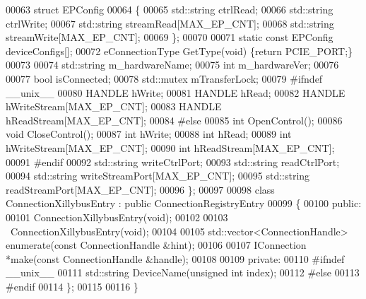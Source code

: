 \begin{DoxyCode}
00063     \textcolor{keyword}{struct }EPConfig
00064     \{
00065         std::string ctrlRead;
00066         std::string ctrlWrite;
00067         std::string streamRead[MAX_EP_CNT];
00068         std::string streamWrite[MAX_EP_CNT];
00069     \};
00070 
00071     \textcolor{keyword}{static} \textcolor{keyword}{const} EPConfig deviceConfigs[];
00072     eConnectionType GetType(\textcolor{keywordtype}{void}) \{\textcolor{keywordflow}{return} PCIE_PORT;\}
00073 
00074     std::string m_hardwareName;
00075     \textcolor{keywordtype}{int} m_hardwareVer;
00076 
00077     \textcolor{keywordtype}{bool} isConnected;
00078     std::mutex mTransferLock;
00079 \textcolor{preprocessor}{#ifndef \_\_unix\_\_}
00080     HANDLE hWrite;
00081     HANDLE hRead;
00082     HANDLE hWriteStream[MAX_EP_CNT];
00083     HANDLE hReadStream[MAX_EP_CNT];
00084 \textcolor{preprocessor}{#else}
00085     \textcolor{keywordtype}{int} OpenControl();
00086     \textcolor{keywordtype}{void} CloseControl();
00087     \textcolor{keywordtype}{int} hWrite;
00088     \textcolor{keywordtype}{int} hRead;
00089     \textcolor{keywordtype}{int} hWriteStream[MAX_EP_CNT];
00090     \textcolor{keywordtype}{int} hReadStream[MAX_EP_CNT];
00091 \textcolor{preprocessor}{#endif}
00092     std::string writeCtrlPort;
00093     std::string readCtrlPort;
00094     std::string writeStreamPort[MAX_EP_CNT];
00095     std::string readStreamPort[MAX_EP_CNT];
00096 \};
00097 
00098 \textcolor{keyword}{class }ConnectionXillybusEntry : \textcolor{keyword}{public} ConnectionRegistryEntry
00099 \{
00100 \textcolor{keyword}{public}:
00101     ConnectionXillybusEntry(\textcolor{keywordtype}{void});
00102 
00103     ~ConnectionXillybusEntry(\textcolor{keywordtype}{void});
00104 
00105     std::vector<ConnectionHandle> enumerate(\textcolor{keyword}{const} ConnectionHandle &hint);
00106 
00107     IConnection *make(\textcolor{keyword}{const} ConnectionHandle &handle);
00108 
00109 \textcolor{keyword}{private}:
00110 \textcolor{preprocessor}{    #ifndef \_\_unix\_\_}
00111     std::string DeviceName(\textcolor{keywordtype}{unsigned} \textcolor{keywordtype}{int} index);
00112 \textcolor{preprocessor}{    #else}
00113 \textcolor{preprocessor}{    #endif}
00114 \};
00115 
00116 \}
\end{DoxyCode}
